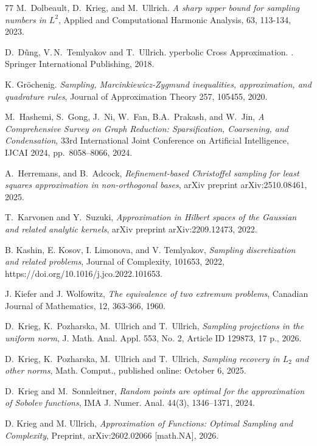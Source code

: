 \documentclass[a4paper,11pt]{article}
\renewcommand{\(}{\left (}
\renewcommand{\)}{\right )}
\newcommand{\<}{\langle}
\renewcommand{\>}{\rangle}
\theoremstyle{definition}
\begin{document}
\begin{thebibliography}{77}
M.~Dolbeault, D.~Krieg, and M.~Ullrich.
\emph{A sharp upper bound for sampling numbers in ${L}^2$},
Applied and Computational Harmonic Analysis, 63, 113-134, 2023.

{D.}~D\~ung, V.\,N.~Temlyakov and T.~Ullrich.
yperbolic {C}ross {A}pproximation.
.
  Springer International Publishing, 2018.

 K. Gr{\"o}chenig.
\emph{Sampling, {Marcinkiewicz}-{Zygmund} inequalities, approximation, and quadrature rules}, 
Journal of Approximation Theory 257, 105455, 2020.

M.~Hashemi, S.~Gong, J.~Ni, W.~Fan, B.A.~Prakash, and W.~Jin,
{\it A Comprehensive Survey on Graph Reduction: Sparsification, Coarsening, and Condensation},
33rd International Joint Conference on Artificial Intelligence, IJCAI 2024, pp.~8058--8066, 2024.

A.~Herremans, and B.~Adcock, {\it Refinement-based Christoffel sampling for least squares approximation in non-orthogonal bases}, arXiv preprint arXiv:2510.08461, 2025.

T.~Karvonen and Y.~Suzuki,
\emph{Approximation in Hilbert spaces of the Gaussian and related analytic kernels}, arXiv preprint arXiv:2209.12473, 2022.

 B. Kashin, E. Kosov, I. Limonova, and V. Temlyakov,
{\it Sampling discretization and related problems},
Journal of Complexity, 101653, 2022,
https://doi.org/10.1016/j.jco.2022.101653.

 J. Kiefer and J. Wolfowitz, {\it The equivalence of two extremum problems}, Canadian Journal of Mathematics, 12, 363-366, 1960.

D.~Krieg, K.~Pozharska, M.~Ullrich and T.~Ullrich,
\emph{Sampling projections in the uniform norm},
J. Math. Anal. Appl. 553, No. 2, Article ID 129873, 17 p., 2026.

D.~Krieg, K.~Pozharska, M.~Ullrich and T.~Ullrich,
\emph{Sampling recovery in ${L}_2 $ and other norms}, 
Math. Comput., published online: October 6, 2025.

 D.~Krieg and M.~Sonnleitner, 
{\it Random points are optimal for the approximation of Sobolev functions}, 
IMA J. Numer. Anal. 44(3), 1346--1371, 2024.

D. Krieg and M. Ullrich, {\it Approximation of Functions: Optimal Sampling and Complexity}, Preprint, arXiv:2602.02066 [math.NA], 2026.


\end{thebibliography}
\end{document}
